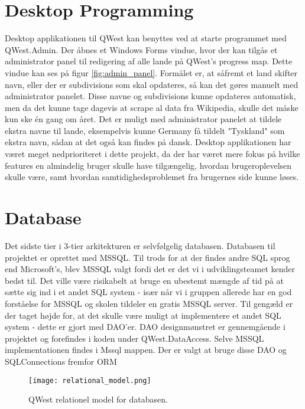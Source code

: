 \section{Desktop Programming}\label{sec:deskProgramming}
Desktop applikationen til QWest kan benyttes ved at starte programmet med QWest.Admin. Der åbnes et Windows Forms \cite{WinForms} vindue, hvor der kan tilgås et administrator panel til redigering af alle lande på QWest's progress map. Dette vindue kan ses på figur \ref{fig:admin_panel}. Formålet er, at såfremt et land skifter navn, eller der er subdivisions som skal opdateres, så kan det gøres manuelt med administrator panelet. Disse navne og subdivisions kunne opdateres automatisk, men da det kunne tage dagevis at scrape al data fra Wikipedia, skulle det måske kun ske én gang om året. Det er muligt med administrator panelet at tildele ekstra navne til lande, eksempelvis kunne Germany få tildelt "Tyskland" som ekstra navn, sådan at det også kan findes på dansk.
Desktop applikationen har været meget nedprioriteret i dette projekt, da der har været mere fokus på hvilke features en almindelig bruger skulle have tilgængelig, hvordan brugeroplevelsen skulle være, samt hvordan samtidighedsproblemet fra brugernes side kunne løses.

\section{Database}\label{sec:databaseACR}
Det sidste tier i 3-tier arkitekturen er selvfølgelig databasen. Databasen til projektet er oprettet med MSSQL\cite{MSSQL}. Til trods for at der findes andre SQL sprog end Microsoft's, blev MSSQL valgt fordi det er det vi i udviklingsteamet kender bedst til. Det ville være risikabelt at bruge en ubestemt mængde af tid på at sætte sig ind i et andet SQL system - især når vi i gruppen allerede har en god forståelse for MSSQL og skolen tildeler en gratis MSSQL server. Til gengæld er der taget højde for, at det skulle være muligt at implementere et andet SQL system - dette er gjort med DAO'er. DAO\cite{dao} designmønstret er gennemgående i projektet og forefindes i koden under QWest.DataAccess. Selve MSSQL implementationen findes i Mssql mappen. Der er valgt at bruge disse DAO og SQLConnections fremfor ORM %

\begin{figure}
    \texttt{[image: relational\_model.png]}
    \caption{QWest relationel model for databasen.}
    \label{fig:relational_model}
\end{figure}

